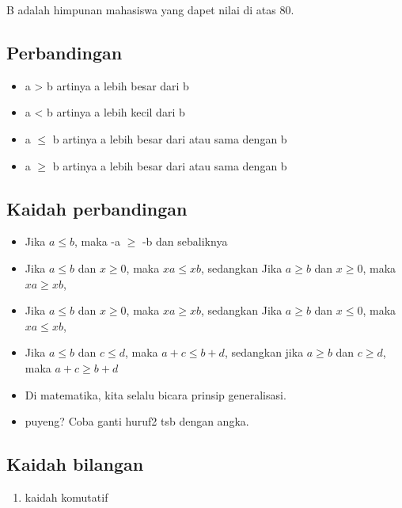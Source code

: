 \documentclass[
  letterpaper,
  DIV=11,
  numbers=noendperiod]{scrartcl}
\providecommand{\tightlist}{%
  \setlength{\itemsep}{0pt}\setlength{\parskip}{0pt}}\usepackage{longtable,booktabs,array}
\begin{document}
B adalah himpunan mahasiswa yang dapet nilai di atas 80.

\subsection{Perbandingan}\label{perbandingan}

\begin{itemize}
\tightlist
\item
  a \textgreater{} b artinya a lebih besar dari b
\item
  a \textless{} b artinya a lebih kecil dari b
\item
  a \(\leq\) b artinya a lebih besar dari atau sama dengan b
\item
  a \(\geq\) b artinya a lebih besar dari atau sama dengan b
\end{itemize}

\subsection{Kaidah perbandingan}\label{kaidah-perbandingan}

\begin{itemize}
\item
  Jika \(a \leq b\), maka -a \(\geq\) -b dan sebaliknya
\item
  Jika \(a \leq b\) dan \(x \geq 0\), maka \(xa \leq xb\), sedangkan
  Jika \(a \geq b\) dan \(x \geq 0\), maka \(xa \geq xb\),
\item
  Jika \(a \leq b\) dan \(x \geq 0\), maka \(xa \geq xb\), sedangkan
  Jika \(a \geq b\) dan \(x \leq 0\), maka \(xa \leq xb\),
\item
  Jika \(a \leq b\) dan \(c \leq d\), maka \(a+c \leq b+d\), sedangkan
  jika \(a \geq b\) dan \(c \geq d\), maka \(a+c \geq b+d\)
\item
  Di matematika, kita selalu bicara prinsip generalisasi.
\item
  puyeng? Coba ganti huruf2 tsb dengan angka.
\end{itemize}

\subsection{Kaidah bilangan}\label{kaidah-bilangan}

\begin{enumerate}
\def\labelenumi{\arabic{enumi}.}
\tightlist
\item
  kaidah komutatif
\end{enumerate}
\end{document}
